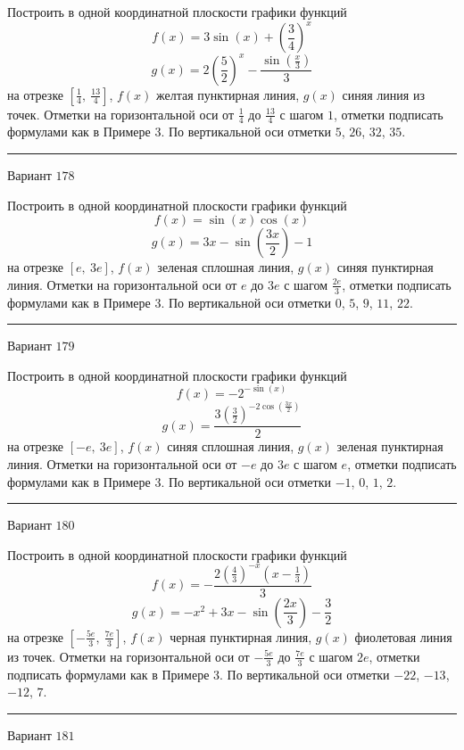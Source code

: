 \documentclass[11pt]{report}
\begin{document}
Построить в одной координатной плоскости графики функций $$f(x) = 3 \sin{\left(x \right)} + \left(\frac{3}{4}\right)^{x}$$ $$g(x) = 2 \left(\frac{5}{2}\right)^{x} - \frac{\sin{\left(\frac{x}{3} \right)}}{3}$$ на отрезке $\left[\frac{1}{4}, \  \frac{13}{4}\right]$, $f(x)$ желтая пунктирная линия, $g(x)$ синяя линия из точек. Отметки на горизонтальной оси от $\frac{1}{4}$ до $\frac{13}{4}$ с шагом $1$, отметки подписать формулами как в Примере 3. По вертикальной оси отметки $5$, $26$, $32$, $35$.
\begin{center}
\noindent\rule{8cm}{0.4pt}
\end{center}
Вариант $178$


Построить в одной координатной плоскости графики функций $$f(x) = \sin{\left(x \right)} \cos{\left(x \right)}$$ $$g(x) = 3 x - \sin{\left(\frac{3 x}{2} \right)} - 1$$ на отрезке $\left[e, \  3 e\right]$, $f(x)$ зеленая сплошная линия, $g(x)$ синяя пунктирная линия. Отметки на горизонтальной оси от $e$ до $3 e$ с шагом $\frac{2 e}{3}$, отметки подписать формулами как в Примере 3. По вертикальной оси отметки $0$, $5$, $9$, $11$, $22$.
\begin{center}
\noindent\rule{8cm}{0.4pt}
\end{center}
Вариант $179$


Построить в одной координатной плоскости графики функций $$f(x) = - 2^{- \sin{\left(x \right)}}$$ $$g(x) = \frac{3 \left(\frac{3}{2}\right)^{- 2 \cos{\left(\frac{3 x}{2} \right)}}}{2}$$ на отрезке $\left[- e, \  3 e\right]$, $f(x)$ синяя сплошная линия, $g(x)$ зеленая пунктирная линия. Отметки на горизонтальной оси от $- e$ до $3 e$ с шагом $e$, отметки подписать формулами как в Примере 3. По вертикальной оси отметки $-1$, $0$, $1$, $2$.
\begin{center}
\noindent\rule{8cm}{0.4pt}
\end{center}
Вариант $180$


Построить в одной координатной плоскости графики функций $$f(x) = - \frac{2 \left(\frac{4}{3}\right)^{- x} \left(x - \frac{1}{3}\right)}{3}$$ $$g(x) = - x^{2} + 3 x - \sin{\left(\frac{2 x}{3} \right)} - \frac{3}{2}$$ на отрезке $\left[- \frac{5 e}{3}, \  \frac{7 e}{3}\right]$, $f(x)$ черная пунктирная линия, $g(x)$ фиолетовая линия из точек. Отметки на горизонтальной оси от $- \frac{5 e}{3}$ до $\frac{7 e}{3}$ с шагом $2 e$, отметки подписать формулами как в Примере 3. По вертикальной оси отметки $-22$, $-13$, $-12$, $7$.
\begin{center}
\noindent\rule{8cm}{0.4pt}
\end{center}
Вариант $181$
\end{document}
